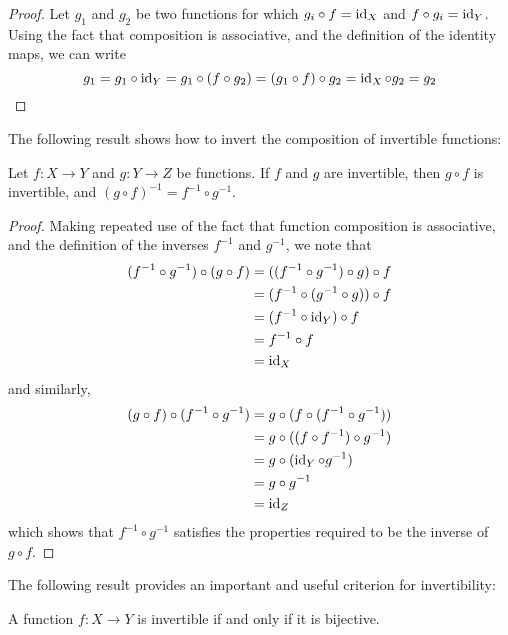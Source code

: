 \begin{proof}
Let $g_1$ and $g_2$ be two functions for which $g_i \circ f = \operatorname{id}_X$ and $f \circ g_i = \operatorname{id}_Y$. Using the fact that composition is associative, and the definition of the identity maps, we can write
\[ g_1 = g_1 \circ \operatorname{id}_Y = g_1 \circ (f \circ g_2) = (g_1 \circ f) \circ g_2 = \operatorname{id}_X \circ g_2 = g_2 \]
\end{proof}

The following result shows how to invert the composition of invertible functions:

\begin{proposition}
Let $f:X \to Y$ and $g:Y \to Z$ be functions. If $f$ and $g$ are invertible, then $g \circ f$ is invertible, and $(g \circ f)^{-1} = f^{-1} \circ g^{-1}$.
\end{proposition}
\begin{proof}
Making repeated use of the fact that function composition is associative, and the definition of the inverses $f^{-1}$ and $g^{-1}$, we note that
\begin{align*}
(f^{-1}\circ g^{-1}) \circ (g \circ f) 
&= ((f^{-1} \circ g^{-1}) \circ g) \circ f \\
&= (f^{-1} \circ (g^{-1} \circ g)) \circ f \\
&= (f^{-1} \circ \operatorname{id}_Y) \circ f \\
&= f^{-1} \circ f \\
&= \operatorname{id}_X
\end{align*}
and similarly,
\begin{align*}
(g \circ f) \circ (f^{-1} \circ g^{-1}) 
&= g \circ (f \circ (f^{-1} \circ g^{-1})) \\
&= g \circ ((f \circ f^{-1}) \circ g^{-1}) \\
&= g \circ (\operatorname{id}_Y \circ g^{-1}) \\
&= g \circ g^{-1} \\
&= \operatorname{id}_Z
\end{align*}
which shows that $f^{-1} \circ g^{-1}$ satisfies the properties required to be the inverse of $g \circ f$.
\end{proof}

The following result provides an important and useful criterion for invertibility:

\begin{theorem}
A function $f:X \to Y$ is invertible if and only if it is bijective.
\end{theorem}


